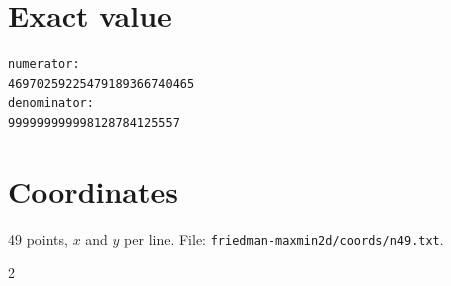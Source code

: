 \documentclass[11pt,a4paper]{article}
\begin{document}
\appendix
\section{Exact value}
{\small
\begin{verbatim}
numerator:
46970259225479189366740465
denominator:
999999999998128784125557
\end{verbatim}}

\section{Coordinates}
49 points, $x$ and $y$ per line. File: \texttt{friedman-maxmin2d/coords/n49.txt}.
{\tiny
\begin{multicols}{2}
\end{multicols}}
\end{document}
